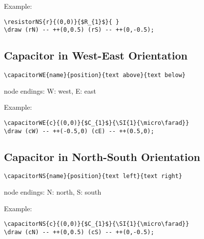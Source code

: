 \documentclass[parskip=full]{scrartcl}
\begin{document}
Example:\\
\begin{minipage}{0.8\textwidth}
\begin{verbatim}
\resistorNS{r}{(0,0)}{$R_{1}$}{ }
\draw (rN) -- ++(0,0.5) (rS) -- ++(0,-0.5);
\end{verbatim}
\end{minipage}
\begin{minipage}{0.19\textwidth}
\end{minipage}

\subsection{Capacitor in West-East Orientation}

\begin{verbatim}
\capacitorWE{name}{position}{text above}{text below}
\end{verbatim}
node endings: W: west, E: east

Example:\\
\begin{minipage}{0.8\textwidth}
\begin{verbatim}
\capacitorWE{c}{(0,0)}{$C_{1}$}{\SI{1}{\micro\farad}}
\draw (cW) -- ++(-0.5,0) (cE) -- ++(0.5,0);
\end{verbatim}
\end{minipage}
\begin{minipage}{0.19\textwidth}
\end{minipage}

\subsection{Capacitor in North-South Orientation}

\begin{verbatim}
\capacitorNS{name}{position}{text left}{text right}
\end{verbatim}
node endings: N: north, S: south

Example:\\
\begin{minipage}{0.8\textwidth}
\begin{verbatim}
\capacitorNS{c}{(0,0)}{$C_{1}$}{\SI{1}{\micro\farad}}
\draw (cN) -- ++(0,0.5) (cS) -- ++(0,-0.5);
\end{verbatim}
\end{minipage}
\begin{minipage}{0.19\textwidth}
\end{minipage}
\end{document}

